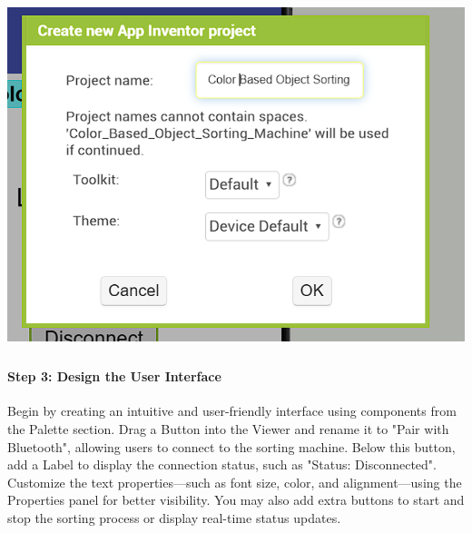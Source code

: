 \documentclass[conference, onecolumn]{IEEEtran}
\begin{document}
\begin{center}
    \includegraphics[height=10cm, width=0.9 \textwidth]{IOT Create a new Project1.png}
    \label{fig1}
    \end{center}
     \vspace{1em}
\noindent
\clearpage

\paragraph{Step 3: Design the User Interface}  
Begin by creating an intuitive and user-friendly interface using components from the Palette section. Drag a Button into the Viewer and rename it to "Pair with Bluetooth", allowing users to connect to the sorting machine. Below this button, add a Label to display the connection status, such as "Status: Disconnected". Customize the text properties—such as font size, color, and alignment—using the Properties panel for better visibility. You may also add extra buttons to start and stop the sorting process or display real-time status updates.
\end{document}
